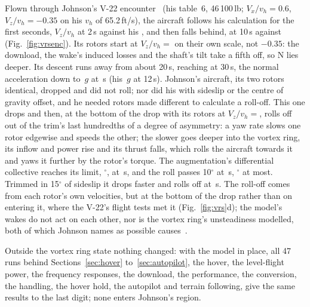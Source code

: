 \documentclass[10pt,a4paper,twocolumn]{article}
\begin{document}
Flown through Johnson's V-22 encounter~\cite{vrs} (his table~6, 46\,100\,lb; $V_x/v_h=0.6$, $V_z/v_h=-0.35$ on his $v_h$ of 65.2\,ft/s), the
aircraft follows his calculation for the first seconds, $V_z/v_h$ \NEncVzTwo{} at 2\,s against his \NEncJohnsonVzTwo, and then falls behind,
\NEncVzTen{} at 10\,s against \NEncJohnsonVzTen{} (Fig.~\ref{fig:vrsenc}). Its rotors start at $V_z/v_h={}$\NEncZ{} on their own scale, not
$-0.35$: the download, the wake's induced losses and the shaft's tilt take a fifth off, so N lies deeper. Its descent runs away from about
20\,s, reaching \NEncVzThirty{} at 30\,s, the normal acceleration down to \NEncNz\,$g$ at \NEncNzT\,s (his \NEncJohnsonNz\,$g$ at 12\,s). Johnson's
aircraft, its two rotors identical, dropped and did not roll; nor did his with sideslip or the centre of gravity offset, and he needed
rotors made different to calculate a roll-off. This one drops and then, at the bottom of the drop with its rotors at $V_z/v_h={}$\NEncRollZ{},
rolls off out of the trim's last hundredths of a degree of asymmetry: a yaw rate slows one rotor edgewise and speeds the other; the slower
goes deeper into the vortex ring, its inflow and power rise and its thrust falls, which rolls the aircraft towards it and yaws it further
by the rotor's torque. The augmentation's differential collective reaches its limit, \NEncSat$^\circ$, at \NEncSatT\,s, and the roll
passes 10$^\circ$ at \NEncRollT\,s, \NEncRollMax$^\circ$ at most. Trimmed in 15$^\circ$ of sideslip it drops faster and rolls off at
\NEncSlipRollT\,s. The roll-off comes from each rotor's own velocities, but at the bottom of the drop rather than on entering it, where the
V-22's flight tests met it (Fig.~\ref{fig:vrs}d); the model's wakes do not act on each other, nor is the vortex ring's
unsteadiness modelled, both of which Johnson names as possible causes~\cite{vrs}.

Outside the vortex ring state nothing changed: with the model in place, all 47 runs behind Sections~\ref{sec:hover} to~\ref{sec:autopilot}, the
hover, the level-flight power, the frequency responses, the download, the performance, the conversion, the handling, the hover hold, the
autopilot and terrain following, give the same results to the last digit; none enters Johnson's region.

\end{document}
